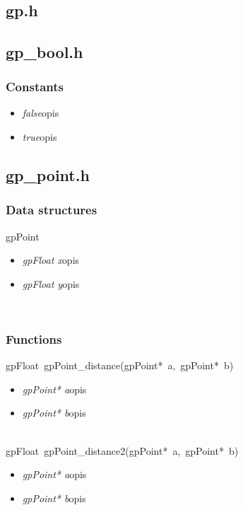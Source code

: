  \ \\

\subsection{gp.h}

\subsection{gp_bool.h}
\subsubsection{Constants}
\begin{itemize}
\item \textit{false}\qquad opis
\item \textit{true}\qquad opis
\end{itemize}

\subsection{gp_point.h}
\subsubsection{Data structures}
\textsf{gpPoint}
	\begin{itemize}
		\item \textit{gpFloat x}\quad opis
		\item \textit{gpFloat y}\quad opis
	\end{itemize}
\ \\
\subsubsection{Functions}
\mbox{\textsf{gpFloat gpPoint_distance(gpPoint* a, gpPoint* b)}}
	\begin{itemize}
		\item \textit{gpPoint* a}\quad opis
		\item \textit{gpPoint* b}\quad opis
	\end{itemize}

 \ \\
\mbox{\textsf{gpFloat gpPoint_distance2(gpPoint* a, gpPoint* b)}}
	\begin{itemize}
		\item \textit{gpPoint* a}\quad opis
		\item \textit{gpPoint* b}\quad opis
	\end{itemize}

